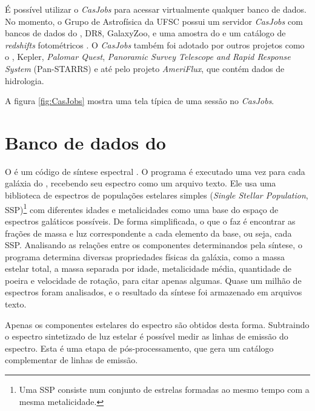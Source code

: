 É possível utilizar o {\em CasJobs} para acessar virtualmente qualquer banco de
dados. No momento, o Grupo de Astrofísica da UFSC possui um servidor {\em
CasJobs} com bancos de dados do \starlight, \SDSS DR8, GalaxyZoo\citneed, e uma
amostra do \galex e um catálogo de {\em redshifts} fotométricos
\citep{OMill2011}. O {\em CasJobs} também foi adotado por outros projetos como o
\galex, Kepler\citneed, {\em Palomar Quest}\citneed, {\em Panoramic Survey
Telescope and Rapid Response System} (Pan-STARRS) e até pelo projeto {\em
AmeriFlux}, que contém dados de hidrologia\citneed.

A figura \ref{fig:CasJobs} mostra uma tela típica de uma sessão no {\em
CasJobs}.



\section{Banco de dados do \starlight}
O \starlight é um código de síntese espectral \citep{CidFernandes2005}. O
programa é executado uma vez para cada galáxia do \SDSS, recebendo seu espectro
como um arquivo texto. Ele usa uma biblioteca de espectros de populações
estelares simples ({\em Single Stellar Population}, SSP)\footnote{Uma SSP
consiste num conjunto de estrelas formadas ao mesmo tempo com a mesma
metalicidade.\fixme} com diferentes idades e metalicidades como uma base do
espaço de espectros galáticos possíveis. De forma simplificada, o que o
\starlight faz é encontrar as frações de massa e luz correspondente a cada
elemento da base, ou seja, cada SSP. Analisando as relações entre os componentes
determinandos pela síntese, o programa determina diversas propriedades físicas
da galáxia, como a massa estelar total, a massa separada por idade, metalicidade
média, quantidade de poeira e velocidade de rotação, para citar apenas algumas.
Quase um milhão de espectros foram analisados, e o resultado da síntese foi
armazenado em arquivos texto.

Apenas os componentes estelares do espectro são obtidos desta forma. Subtraindo
o espectro sintetizado de luz estelar é possível medir as linhas de emissão do
espectro. Esta é uma etapa de pós-processamento, que gera um catálogo
complementar de linhas de emissão.

